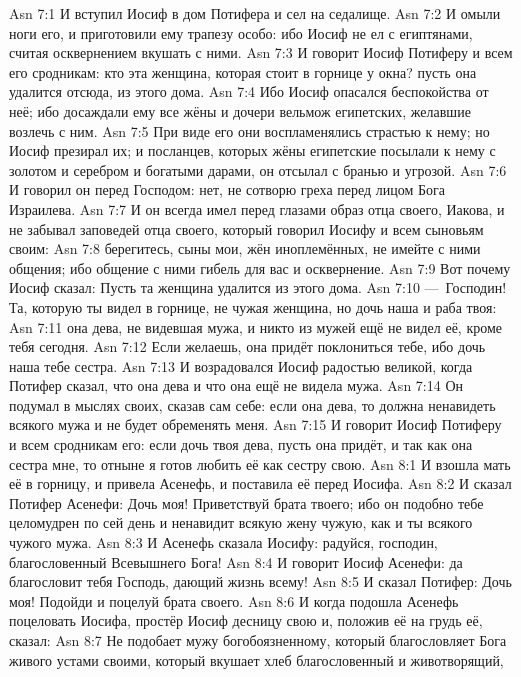 \vs Asn 7:1
И вступил Иосиф в дом Потифера и сел на седалище.
\vs Asn 7:2
И омыли ноги его, и приготовили ему трапезу особо:
ибо Иосиф не ел с египтянами,
считая осквернением вкушать с ними.
\vs Asn 7:3
И говорит Иосиф Потиферу и всем его сродникам:
кто эта женщина, которая стоит в горнице у окна?
пусть она удалится отсюда, из этого дома.
\vs Asn 7:4
Ибо Иосиф опасался беспокойства от неё;
ибо досаждали ему все жёны и дочери вельмож египетских,
желавшие возлечь с ним.
\vs Asn 7:5
При виде его они воспламенялись страстью к нему;
но Иосиф презирал их; и посланцев,
которых жёны египетские посылали
к нему с золотом и серебром и богатыми дарами,
он отсылал с бранью и угрозой.
\vs Asn 7:6
И говорил он перед Господом:
нет, не сотворю греха перед лицом Бога Израилева.
\vs Asn 7:7
И он всегда имел перед глазами образ отца своего,
Иакова, и не забывал заповедей отца своего,
который говорил Иосифу и всем сыновьям своим:
\vs Asn 7:8
берегитесь, сыны мои, жён иноплемённых,
не имейте с ними общения;
ибо общение с ними гибель для вас и осквернение.
\vs Asn 7:9
Вот почему Иосиф сказал:
Пусть та женщина удалится из этого дома.
\vs Asn 7:10
---~Господин! Та, которую ты видел в горнице,
не чужая женщина, но дочь наша и раба твоя:
\vs Asn 7:11
она дева, не видевшая мужа,
и никто из мужей ещё не видел её, кроме тебя сегодня.
\vs Asn 7:12
Если желаешь, она придёт поклониться тебе,
ибо дочь наша тебе сестра.
\vs Asn 7:13
И возрадовался Иосиф радостью великой,
когда Потифер сказал, что она дева
и что она ещё не видела мужа.
\vs Asn 7:14
Он подумал в мыслях своих, сказав сам себе:
если она дева, то должна ненавидеть всякого мужа
и не будет обременять меня.
\vs Asn 7:15
И говорит Иосиф Потиферу и всем сродникам его:
если дочь твоя дева, пусть она придёт, и так как она
сестра мне, то отныне я готов любить её как сестру свою.
\vs Asn 8:1
И взошла мать её в горницу,
и привела Асенефь, и поставила её перед Иосифа.
\vs Asn 8:2
И сказал Потифер Асенефи:
Дочь моя!
Приветствуй брата твоего; ибо он подобно тебе целомудрен по сей день
и ненавидит всякую жену чужую, как и ты всякого чужого мужа.
\vs Asn 8:3
И Асенефь сказала Иосифу:
радуйся, господин, благословенный Всевышнего Бога!
\vs Asn 8:4
И говорит Иосиф Асенефи:
да благословит тебя Господь, дающий жизнь всему!
\vs Asn 8:5
И сказал Потифер: Дочь моя!
Подойди и поцелуй брата своего.
\vs Asn 8:6
И когда подошла Асенефь поцеловать Иосифа,
простёр Иосиф десницу свою и, положив её на грудь её, сказал:
\vs Asn 8:7
Не подобает мужу богобоязненному,
который благословляет Бога живого устами своими,
который вкушает хлеб благословенный и животворящий,
